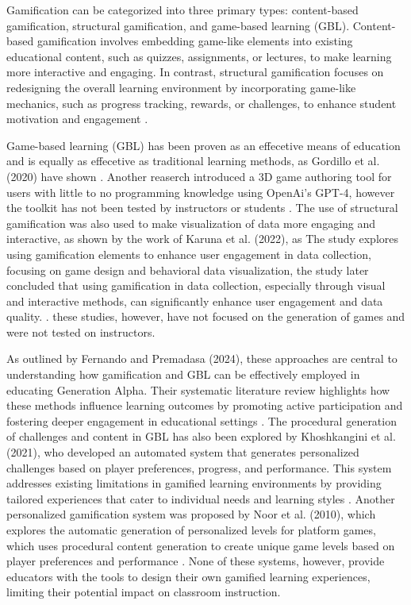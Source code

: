 Gamification can be categorized into three primary types: content-based gamification, structural gamification, and game-based learning (GBL). Content-based gamification involves embedding game-like elements into existing educational content, such as quizzes, assignments, or lectures, to make learning more interactive and engaging. In contrast, structural gamification focuses on redesigning the overall learning environment by incorporating game-like mechanics, such as progress tracking, rewards, or challenges, to enhance student motivation and engagement \cite{fernando2024}.

Game-based learning (GBL) has been proven as an effecetive means of education and is equally as effecetive as traditional learning methods, as Gordillo et al. (2020) have shown \cite{sgame2020}. Another reaserch introduced a 3D game authoring tool for users with little to no programming knowledge using OpenAi's GPT-4, however the toolkit has not been tested by instructors or students \cite{horn2023}. The use of structural gamification was also used to make visualization of data more engaging and interactive, as shown by the work of Karuna et al. (2022), as The study explores using gamification elements to enhance user engagement in data collection, focusing on game design and behavioral data visualization, the study later  concluded that using gamification in data collection, especially through visual and interactive methods, can significantly enhance user engagement and data quality. \cite{karuna2019}. these studies, however, have not focused on the generation of games and were not tested on instructors.

As outlined by Fernando and Premadasa (2024), these approaches are central to understanding how gamification and GBL can be effectively employed in educating Generation Alpha. Their systematic literature review highlights how these methods influence learning outcomes by promoting active participation and fostering deeper engagement in educational settings \cite{fernando2024}. The procedural generation of challenges and content in GBL has also been explored by Khoshkangini et al. (2021), who developed an automated system that generates personalized challenges based on player preferences, progress, and performance. This system addresses existing limitations in gamified learning environments by providing tailored experiences that cater to individual needs and learning styles \cite{khoshkangini2021}. Another personalized gamification system was proposed by Noor et al. (2010), which explores the automatic generation of personalized levels for platform games, which uses procedural content generation to create unique game levels based on player preferences and performance \cite{noor2010}. None of these systems, however, provide educators with the tools to design their own gamified learning experiences, limiting their potential impact on classroom instruction.

